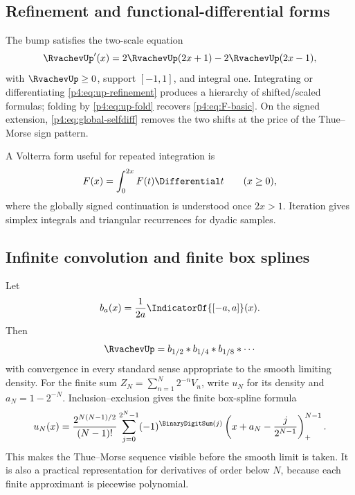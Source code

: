 \documentclass[11pt]{article}
\theoremstyle{definition}
\theoremstyle{remark}
\begin{document}
\subsection{Refinement and functional-differential forms}

The bump satisfies the two-scale equation
\begin{equation}
 \RvachevUp'(x)=2\RvachevUp(2x+1)-2\RvachevUp(2x-1),
 \label{p4:eq:up-refinement}
\end{equation}
with \(\RvachevUp\ge0\), support \([-1,1]\), and integral one.  Integrating or differentiating
\eqref{p4:eq:up-refinement} produces a hierarchy of shifted/scaled formulas; folding by
\eqref{p4:eq:up-fold} recovers \eqref{p4:eq:F-basic}.  On the signed extension,
\eqref{p4:eq:global-selfdiff} removes the two shifts at the price of the Thue--Morse sign
pattern.

A Volterra form useful for repeated integration is
\begin{equation}
 F(x)=\int_0^{2x}F(t)\Differential t\qquad(x\ge0),
 \label{p4:eq:volterra-F}
\end{equation}
where the globally signed continuation is understood once \(2x>1\).  Iteration gives
simplex integrals and triangular recurrences for dyadic samples.

\subsection{Infinite convolution and finite box splines}

Let
\[
 b_a(x)=\frac1{2a}\IndicatorOf{[-a,a]}(x).
\]
Then
\begin{equation}
 \RvachevUp=b_{1/2}*b_{1/4}*b_{1/8}*\cdots
 \label{p4:eq:infinite-convolution}
\end{equation}
with convergence in every standard sense appropriate to the smooth limiting density.
For the finite sum \(Z_N=\sum_{n=1}^N2^{-n}V_n\), write \(u_N\) for its density and
\(a_N=1-2^{-N}\).  Inclusion--exclusion gives the finite box-spline formula
\begin{equation}
 u_N(x)=\frac{2^{N(N-1)/2}}{(N-1)!}
 \sum_{j=0}^{2^N-1}(-1)^{\BinaryDigitSum(j)}
 \left(x+a_N-\frac{j}{2^{N-1}}\right)_+^{N-1}.
 \label{p4:eq:finite-box-spline}
\end{equation}
This makes the Thue--Morse sequence visible before the smooth limit is taken.  It is
also a practical representation for derivatives of order below \(N\), because each
finite approximant is piecewise polynomial.
\end{document}
